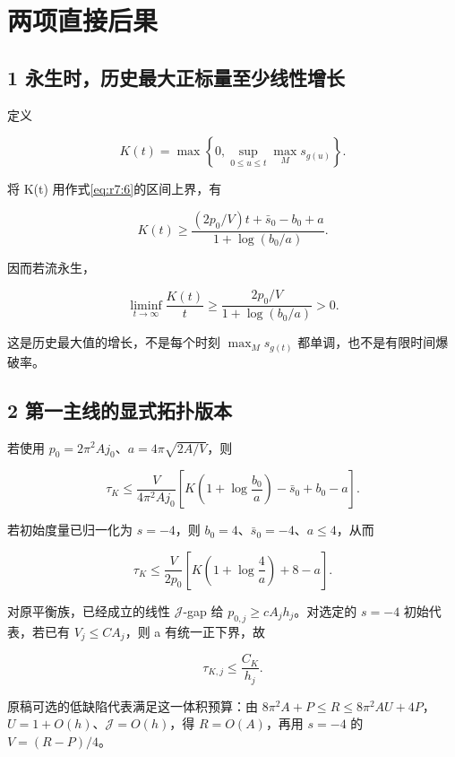 \documentclass[UTF8,11pt,openany,oneside,fontset=none]{ctexbook}
\begin{document}
\section{两项直接后果}\label{ch7:ux4e24ux9879ux76f4ux63a5ux540eux679c}

\subsection{1 永生时，历史最大正标量至少线性增长}\label{ch7:ux6c38ux751fux65f6ux5386ux53f2ux6700ux5927ux6b63ux6807ux91cfux81f3ux5c11ux7ebfux6027ux589eux957f}

定义

\[
 K(t)=\max\left\{0,\sup_{0\le u\le t}\max_Ms_{g(u)}\right\}.
\]

将 K(t) 用作式\eqref{eq:r7:6}的区间上界，有

\[
 \boxed{
 K(t)\ge
 \frac{(2p_0/V)t+\bar s_0-b_0+a}
 {1+\log(b_0/a)}.
 }
\tag{7.7}\label{eq:r7:7}
\]

因而若流永生，

\[
 \liminf_{t\to\infty}\frac{K(t)}t
 \ge\frac{2p_0/V}{1+\log(b_0/a)}>0.
\]

这是历史最大值的增长，不是每个时刻 \(\max_Ms_{g(t)}\) 都单调，也不是有限时间爆破率。

\subsection{2 第一主线的显式拓扑版本}\label{ch7:ux7b2cux4e00ux4e3bux7ebfux7684ux663eux5f0fux62d3ux6251ux7248ux672c}

若使用 \(p_0=2\pi^2Aj_0\)、\(a=4\pi\sqrt{2A/V}\)，则

\[
 \boxed{
 \tau_K\le\frac{V}{4\pi^2Aj_0}
 \left[K\left(1+\log\frac{b_0}{a}\right)-\bar s_0+b_0-a\right].
 }
\tag{7.8}\label{eq:r7:8}
\]

若初始度量已归一化为 \(s=-4\)，则 \(b_0=4\)、\(\bar s_0=-4\)、\(a\le4\)，从而

\[
 \boxed{
 \tau_K\le\frac{V}{2p_0}
 \left[K\left(1+\log\frac4a\right)+8-a\right].
 }
\tag{7.9}\label{eq:r7:9}
\]

对原平衡族，已经成立的线性 \(\mathcal J\)-gap 给 \(p_{0,j}\ge cA_jh_j\)。对选定的 \(s=-4\) 初始代表，若已有 \(V_j\le C A_j\)，则 a 有统一正下界，故

\[
 \boxed{\tau_{K,j}\le\frac{C_K}{h_j}.}
\tag{7.10}\label{eq:r7:10}
\]

原稿可选的低缺陷代表满足这一体积预算：由 \(8\pi^2A+P\le R\le8\pi^2AU+4P\)， \(U=1+O(h)\)、\(\mathcal J=O(h)\)，得 \(R=O(A)\)，再用 \(s=-4\) 的 \(V=(R-P)/4\)。
\end{document}
